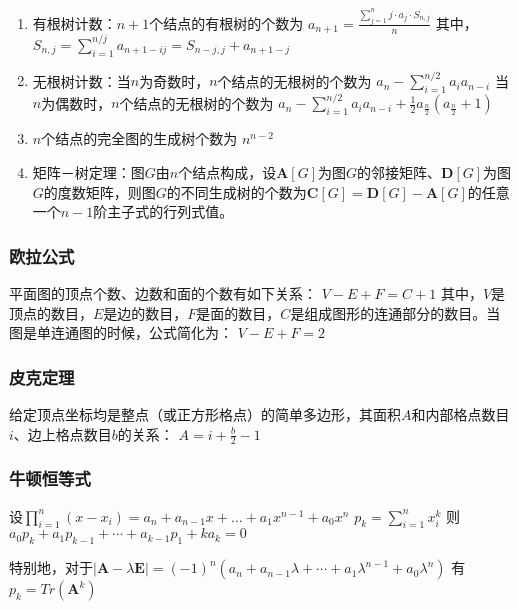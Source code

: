 \documentclass[landscape,twocolumn,a4paper]{article}
\begin{document}
\begin{enumerate}
	\item 有根树计数：$n+1$个结点的有根树的个数为
	$a_{n+1} = \frac{\sum_{j=1}^{n}{j \cdot a_j \cdot{S_{n, j}}}}{n}$
	其中，
	$S_{n, j} = \sum_{i=1}^{n/j}{a_{n+1-ij}} = S_{n-j, j} + a_{n+1-j}$
	\item 无根树计数：当$n$为奇数时，$n$个结点的无根树的个数为
	$a_n-\sum_{i=1}^{n/2}{a_ia_{n-i}}$
	当$n$为偶数时，$n$个结点的无根树的个数为
	$a_n-\sum_{i=1}^{n/2}{a_ia_{n-i}}+\frac{1}{2}a_{\frac{n}{2}}(a_{\frac{n}{2}}+1)$
	\item $n$个结点的完全图的生成树个数为
	$n^{n-2}$
	\item 矩阵－树定理：图$G$由$n$个结点构成，设$\bm{A}[G]$为图$G$的邻接矩阵、$\bm{D}[G]$为图$G$的度数矩阵，则图$G$的不同生成树的个数为$\bm{C}[G] = \bm{D}[G] - \bm{A}[G]$的任意一个$n-1$阶主子式的行列式值。
\end{enumerate}

\subsubsection{欧拉公式}

平面图的顶点个数、边数和面的个数有如下关系：
$V - E + F = C+ 1$
\indent 其中，$V$是顶点的数目，$E$是边的数目，$F$是面的数目，$C$是组成图形的连通部分的数目。当图是单连通图的时候，公式简化为：
$V - E + F = 2$

\subsubsection{皮克定理}

给定顶点坐标均是整点（或正方形格点）的简单多边形，其面积$A$和内部格点数目$i$、边上格点数目$b$的关系：
$A = i + \frac{b}{2} - 1$

\subsubsection{牛顿恒等式}

设$\prod_{i = 1}^n{(x - x_i)} = a_n + a_{n - 1} x + \dots + a_1 x^{n - 1} + a_0 x^n$
$p_k = \sum_{i = 1}^n{x_i^k}$
则$a_0 p_k + a_1 p_{k - 1} + \cdots + a_{k - 1} p_1 + k a_k = 0$

特别地，对于$|\bm{A} - \lambda \bm{E}| = (-1)^n(a_n + a_{n - 1} \lambda + \cdots + a_1 \lambda^{n - 1} + a_0 \lambda^n)$
有$p_k = Tr(\bm{A}^k)$

\end{document}
